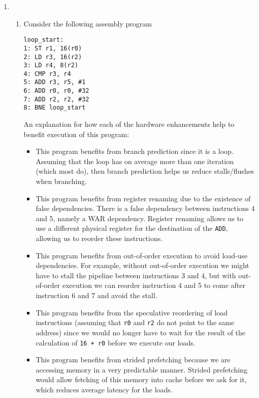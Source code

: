 \begin{enumerate}[label=(\alph*)]
    \item
        \begin{enumerate}[label=(\roman*)]
            \item
                Consider the following assembly program

\begin{verbatim}
loop_start:
1: ST r1, 16(r0)
2: LD r3, 16(r2)
3: LD r4, 8(r2)
4: CMP r3, r4
5: ADD r3, r5, #1
6: ADD r0, r0, #32
7: ADD r2, r2, #32
8: BNE loop_start
\end{verbatim}

An explanation for how each of the hardware enhancements help to benefit execution of this program:

\begin{itemize}
    \item
        This program benefits from branch prediction since it is a loop. Assuming that the loop has on average more than one iteration (which most do), then branch prediction helps us reduce stalls/flushes when branching.

    \item
        This program benefits from register renaming due to the existence of false dependencies. There is a false dependency between instructions 4 and 5, namely a WAR dependency. Register renaming allows us to use a different physical register for the destination of the \texttt{ADD}, allowing us to reorder these instructions.

    \item
        This program benefits from out-of-order execution to avoid load-use dependencies. For example, without out-of-order execution we might have to stall the pipeline between instructions 3 and 4, but with out-of-order execution we can reorder instruction 4 and 5 to come after instruction 6 and 7 and avoid the stall.

    \item
        This program benefits from the speculative reordering of load instructions (assuming that \texttt{r0} and \texttt{r2} do not point to the same address) since we would no longer have to wait for the result of the calculation of \texttt{16 + r0} before we execute our loads.

    \item
        This program benefits from strided prefetching because we are accessing memory in a very predictable manner. Strided prefetching would allow fetching of this memory into cache before we ask for it, which reduces average latency for the loads.
 

\end{itemize}
\end{enumerate}
\end{enumerate}
